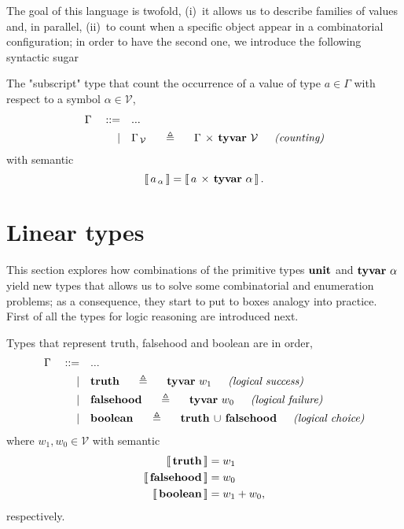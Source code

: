 The goal of this language is twofold, (i)~it allows us to describe families of
values and, in parallel, (ii)~to count when a specific object appear in a
combinatorial configuration; in order to have the second one, we introduce the
following syntactic sugar
\begin{definition}
The "subscript" type that count the occurrence of a value of type $a\in\Gamma$
with respect to a symbol $\alpha\in\mathcal{V}$,
\begin{displaymath}
\begin{split}
    \Gamma\quad::=\quad&... \\
           |\quad&\tydef{\tycount{\Gamma}{\mathcal{V}}}{\tycp{\Gamma}{\tyvar{\mathcal{V}}}}{counting}\\
\end{split}
\end{displaymath}
with semantic
\begin{displaymath}
    \left\llbracket\,{a}_{\,\alpha}\,\right\rrbracket = \left\llbracket\,a\,\times\,\textbf{tyvar}\,\,\alpha\,\right\rrbracket.
\end{displaymath}
\end{definition}

\section{Linear types}

This section explores how combinations of the primitive types $\textbf{unit}$ and
$\textbf{tyvar}\,\,\alpha$ yield new types that allows us to solve some combinatorial and
enumeration problems; as a consequence, they start to put to boxes analogy into
practice. First of all the types for logic reasoning are introduced next.

\begin{definition}[\tytruth, \tyfalsehood, \tyboolean]
Types that represent truth, falsehood and boolean are in order,
\begin{displaymath}
\begin{split}
    \Gamma\quad::=\quad&... \\
           |\quad&\tydef{\tytruth}{\tyvar{w_{1}}}{logical success}\\
           |\quad&\tydef{\tyfalsehood}{\tyvar{w_{0}}}{logical failure}\\
           |\quad&\tydef{\tyboolean}{\tydu{\tytruth}{\tyfalsehood}}{logical choice}\\
\end{split}
\end{displaymath}
where $w_{1}, w_{0} \in\mathcal{V}$ with semantic
\begin{displaymath}
\begin{split}
    \left\llbracket\,\textbf{truth}\,\right\rrbracket &= w_{1}\\
    \left\llbracket\,\textbf{falsehood}\,\right\rrbracket &= w_{0}\\
    \left\llbracket\,\textbf{boolean}\,\right\rrbracket &= w_{1} + w_{0},
\end{split}
\end{displaymath}
respectively.
\end{definition}

